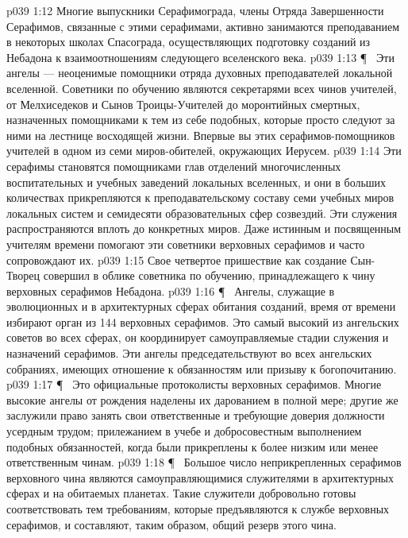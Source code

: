 \vs p039 1:12 Многие выпускники Серафимограда, члены Отряда Завершенности Серафимов, связанные с этими серафимами, активно занимаются преподаванием в некоторых школах Спасограда, осуществляющих подготовку созданий из Небадона к взаимоотношениям следующего вселенского века.
\vs p039 1:13 \P\ \bibnobreakspace {} Эти ангелы --- неоценимые помощники отряда духовных преподавателей локальной вселенной. Советники по обучению являются секретарями всех чинов учителей, от Мелхиседеков и Сынов Троицы\hyp{}Учителей до моронтийных смертных, назначенных помощниками к тем из себе подобных, которые просто следуют за ними на лестнице восходящей жизни. Впервые вы  этих серафимов\hyp{}помощников учителей в одном из семи миров\hyp{}обителей, окружающих Иерусем.
\vs p039 1:14 Эти серафимы становятся помощниками глав отделений многочисленных воспитательных и учебных заведений локальных вселенных, и они в больших количествах прикрепляются к преподавательскому составу семи учебных миров локальных систем и семидесяти образовательных сфер созвездий. Эти служения распространяются вплоть до конкретных миров. Даже истинным и посвященным учителям времени помогают эти советники верховных серафимов и часто сопровождают их.
\vs p039 1:15 Свое четвертое пришествие как создание Сын\hyp{}Творец совершил в облике советника по обучению, принадлежащего к чину верховных серафимов Небадона.
\vs p039 1:16 \P\ \bibnobreakspace {} Ангелы, служащие в эволюционных и в архитектурных сферах обитания созданий, время от времени избирают орган из 144 верховных серафимов. Это самый высокий из ангельских советов во всех сферах, он координирует самоуправляемые стадии служения и назначений серафимов. Эти ангелы председательствуют во всех ангельских собраниях, имеющих отношение к обязанностям или призыву к богопочитанию.
\vs p039 1:17 \P\ \bibnobreakspace {} Это официальные протоколисты верховных серафимов. Многие высокие ангелы от рождения наделены их дарованием в полной мере; другие же заслужили право занять свои ответственные и требующие доверия должности усердным трудом; прилежанием в учебе и добросовестным выполнением подобных обязанностей, когда были прикреплены к более низким или менее ответственным чинам.
\vs p039 1:18 \P\ \bibnobreakspace {} Большое число неприкрепленных серафимов верховного чина являются самоуправляющимися служителями в архитектурных сферах и на обитаемых планетах. Такие служители добровольно готовы соответствовать тем требованиям, которые предъявляются к службе верховных серафимов, и составляют, таким образом, общий резерв этого чина.
